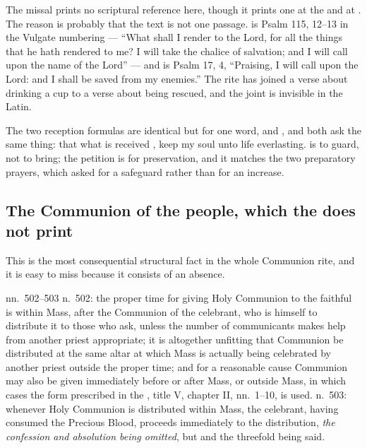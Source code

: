 The missal prints no scriptural reference here, though it prints one at the
 and at . The reason is probably that the
text is not one passage.  is Psalm 115, 12--13 in the Vulgate numbering --- ``What shall I
render to the Lord, for all the things that he hath rendered to me? I will take
the chalice of salvation; and I will call upon the name of the Lord'' --- and
 is Psalm
17, 4, ``Praising, I will call upon the Lord: and I shall be saved from my
enemies.'' The rite has joined a verse about drinking a cup to a verse about
being rescued, and the joint is invisible in the Latin.

The two reception formulas are identical but for one word, 
and , and both ask the same thing: that what is received
, keep my soul unto life
everlasting.  is to guard, not to bring; the petition is for
preservation, and it matches the two preparatory prayers, which asked for a
safeguard rather than for an increase.

\subsection*{The Communion of the people, which the  does not print}

This is the most consequential structural fact in the whole Communion rite, and
it is easy to miss because it consists of an absence.

\begin{rubricnote}{ nn.~502--503}
n.~502: the proper time for giving Holy Communion to the faithful is within
Mass, after the Communion of the celebrant, who is himself to distribute it to
those who ask, unless the number of communicants makes help from another priest
appropriate; it is altogether unfitting that Communion be distributed at the
same altar at which Mass is actually being celebrated by another priest outside
the proper time; and for a reasonable cause Communion may also be given
immediately before or after Mass, or outside Mass, in which cases the form
prescribed in the , title V, chapter II, nn.~1--10, is
used. n.~503: whenever Holy Communion is distributed within Mass, the celebrant,
having consumed the Precious Blood, proceeds immediately to the distribution,
\emph{the confession and absolution being omitted}, but  and the threefold  being said.
\end{rubricnote}

